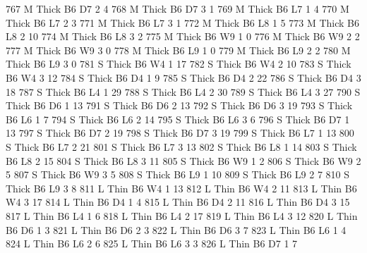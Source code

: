 \documentclass{article}
\begin{document}
\begin{Schunk}
\begin{Soutput}
767       M  Thick   B6      D7     2     4
768       M  Thick   B6      D7     3     1
769       M  Thick   B6      L7     1     4
770       M  Thick   B6      L7     2     3
771       M  Thick   B6      L7     3     1
772       M  Thick   B6      L8     1     5
773       M  Thick   B6      L8     2    10
774       M  Thick   B6      L8     3     2
775       M  Thick   B6      W9     1     0
776       M  Thick   B6      W9     2     2
777       M  Thick   B6      W9     3     0
778       M  Thick   B6      L9     1     0
779       M  Thick   B6      L9     2     2
780       M  Thick   B6      L9     3     0
781       S  Thick   B6      W4     1    17
782       S  Thick   B6      W4     2    10
783       S  Thick   B6      W4     3    12
784       S  Thick   B6      D4     1     9
785       S  Thick   B6      D4     2    22
786       S  Thick   B6      D4     3    18
787       S  Thick   B6      L4     1    29
788       S  Thick   B6      L4     2    30
789       S  Thick   B6      L4     3    27
790       S  Thick   B6      D6     1    13
791       S  Thick   B6      D6     2    13
792       S  Thick   B6      D6     3    19
793       S  Thick   B6      L6     1     7
794       S  Thick   B6      L6     2    14
795       S  Thick   B6      L6     3     6
796       S  Thick   B6      D7     1    13
797       S  Thick   B6      D7     2    19
798       S  Thick   B6      D7     3    19
799       S  Thick   B6      L7     1    13
800       S  Thick   B6      L7     2    21
801       S  Thick   B6      L7     3    13
802       S  Thick   B6      L8     1    14
803       S  Thick   B6      L8     2    15
804       S  Thick   B6      L8     3    11
805       S  Thick   B6      W9     1     2
806       S  Thick   B6      W9     2     5
807       S  Thick   B6      W9     3     5
808       S  Thick   B6      L9     1    10
809       S  Thick   B6      L9     2     7
810       S  Thick   B6      L9     3     8
811       L   Thin   B6      W4     1    13
812       L   Thin   B6      W4     2    11
813       L   Thin   B6      W4     3    17
814       L   Thin   B6      D4     1     4
815       L   Thin   B6      D4     2    11
816       L   Thin   B6      D4     3    15
817       L   Thin   B6      L4     1     6
818       L   Thin   B6      L4     2    17
819       L   Thin   B6      L4     3    12
820       L   Thin   B6      D6     1     3
821       L   Thin   B6      D6     2     3
822       L   Thin   B6      D6     3     7
823       L   Thin   B6      L6     1     4
824       L   Thin   B6      L6     2     6
825       L   Thin   B6      L6     3     3
826       L   Thin   B6      D7     1     7

\end{Soutput}
\end{Schunk}
\end{document}
